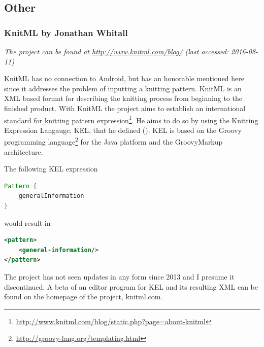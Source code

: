 \subsection{Other}

\subsubsection*{KnitML by Jonathan Whitall}

\textit{The project can be found at \url{http://www.knitml.com/blog/} \small{(last accessed: 2016-08-11)}}
\vspace*{0.5cm}

\noindent KnitML has no connection to Android, but has an honorable mentioned here since it addresses the problem of inputting a knitting pattern. KnitML is an XML based format for describing the knitting process from beginning to the finished product. With KnitML the project aims to establish an international standard for knitting pattern expression\footnote{\url{http://www.knitml.com/blog/static.php?page=about-knitml}}. He aims to do so by using the Knitting Expression Langauge, KEL, that he defined (\cite{knitml}). KEL is based on the Groovy programming language\footnote{\url{http://groovy-lang.org/templating.html}} for the Java platform and the GroovyMarkup architecture.

The following KEL expression

\begin{lstlisting}[language=Java, caption=Example expression in KnitML]
Pattern {
    generalInformation
}
\end{lstlisting}

would result in

\begin{lstlisting}[language=XML, caption=Example expression in KnitM: XML result]
<pattern>
    <general-information/>
</pattern>
\end{lstlisting}

The project has not seen updates in any form since 2013 and I presume it discontinued. A beta of an editor program for KEL and its resulting XML can be found on the homepage of the project, knitml.com.